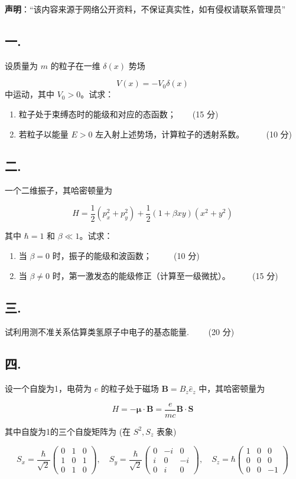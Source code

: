 
\textbf{声明}：“该内容来源于网络公开资料，不保证真实性，如有侵权请联系管理员”

\subsection{一.}
设质量为 $m$ 的粒子在一维 $\delta(x)$ 势场

\[
V(x) = -V_0 \delta(x)~
\]
中运动，其中 $V_0 > 0$。试求：

\begin{enumerate}
    \item 粒子处于束缚态时的能级和对应的态函数；$\qquad $(15 分)
    \item 若粒子以能量 $E > 0$ 左入射上述势场，计算粒子的透射系数。 $\qquad $ (10 分)
\end{enumerate}
\subsection{二.}
 一个二维振子，其哈密顿量为

\[
H = \frac{1}{2} (p_x^2 + p_y^2) + \frac{1}{2} (1 + \beta xy)(x^2 + y^2)~
\]

其中 $\hbar = 1$ 和 $\beta \ll 1$。试求：

\begin{enumerate}
    \item 当 $\beta = 0$ 时，振子的能级和波函数； $\qquad $ (10 分)
    \item 当 $\beta \neq 0$ 时，第一激发态的能级修正（计算至一级微扰）。 $\qquad $ (15 分)
\end{enumerate}
\subsection{三.}
试利用测不准关系估算类氢原子中电子的基态能量.$\qquad $ (20 分)
\subsection{四.}
设一个自旋为1，电荷为 $e$ 的粒子处于磁场 $\mathbf{B} = B_z \hat{e}_z$ 中，其哈密顿量为

\[
H = -\boldsymbol{\mu} \cdot \mathbf{B} = \frac{e}{mc} \mathbf{B} \cdot \mathbf{S}~
\]

其中自旋为1的三个自旋矩阵为 (在 $S^2, S_z$ 表象)

\[
S_x = \frac{\hbar}{\sqrt{2}}
\begin{pmatrix}
0 & 1 & 0 \\
1 & 0 & 1 \\
0 & 1 & 0
\end{pmatrix}
, \quad
S_y = \frac{\hbar}{\sqrt{2}}
\begin{pmatrix}
0 & -i & 0 \\
i & 0 & -i \\
0 & i & 0
\end{pmatrix}
, \quad
S_z = \hbar
\begin{pmatrix}
1 & 0 & 0 \\
0 & 0 & 0 \\
0 & 0 & -1
\end{pmatrix}~
\]

